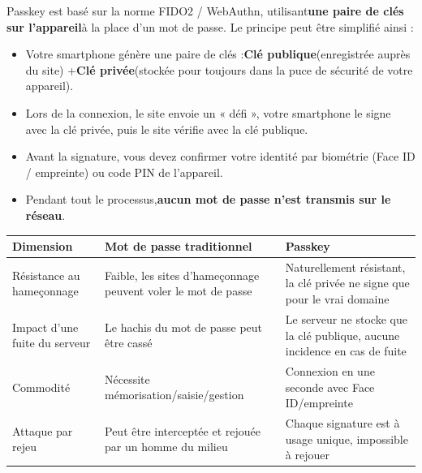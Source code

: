 
Passkey est basé sur la norme FIDO2 / WebAuthn, utilisant\textbf{une paire de clés sur l'appareil}à la place d'un mot de passe. Le principe peut être simplifié ainsi :

\begin{itemize}
  \item Votre smartphone génère une paire de clés :\textbf{Clé publique}(enregistrée auprès du site) +\textbf{Clé privée}(stockée pour toujours dans la puce de sécurité de votre appareil).
  \item Lors de la connexion, le site envoie un « défi », votre smartphone le signe avec la clé privée, puis le site vérifie avec la clé publique.
  \item Avant la signature, vous devez confirmer votre identité par biométrie (Face ID / empreinte) ou code PIN de l'appareil.
  \item Pendant tout le processus,\textbf{aucun mot de passe n'est transmis sur le réseau}.
\end{itemize}


\begin{center}
\begin{tabularx}{\linewidth}{|X|X|X|}
\hline
\textbf{Dimension} & \textbf{Mot de passe traditionnel} & \textbf{Passkey} \tabularnewline
\hline
Résistance au hameçonnage & Faible, les sites d'hameçonnage peuvent voler le mot de passe & Naturellement résistant, la clé privée ne signe que pour le vrai domaine \tabularnewline
Impact d'une fuite du serveur & Le hachis du mot de passe peut être cassé & Le serveur ne stocke que la clé publique, aucune incidence en cas de fuite \tabularnewline
Commodité & Nécessite mémorisation/saisie/gestion & Connexion en une seconde avec Face ID/empreinte \tabularnewline
Attaque par rejeu & Peut être interceptée et rejouée par un homme du milieu & Chaque signature est à usage unique, impossible à rejouer \tabularnewline
\hline
\end{tabularx}
\end{center}


